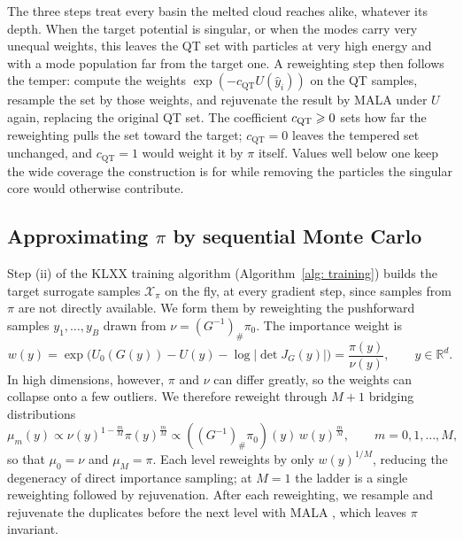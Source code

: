 \documentclass{article}
\begin{document}
The three steps treat every basin the melted cloud reaches alike, whatever its depth. When the target potential is singular, or when the modes carry very unequal weights, this leaves the QT set with particles at very high energy and with a mode population far from the target one. A reweighting step then follows the temper: compute the weights $\exp(-c_{\mathrm{QT}}U(\hat y_i))$ on the QT samples, resample the set by those weights, and rejuvenate the result by MALA under $U$ again, replacing the original QT set. The coefficient $c_{\mathrm{QT}}\geqslant0$ sets how far the reweighting pulls the set toward the target; $c_{\mathrm{QT}}=0$ leaves the tempered set unchanged, and $c_{\mathrm{QT}}=1$ would weight it by $\pi$ itself. Values well below one keep the wide coverage the construction is for while removing the particles the singular core would otherwise contribute.

\subsection{Approximating $\pi$ by sequential Monte Carlo}
\label{subsec: annealing}

Step (ii) of the KLXX training algorithm (Algorithm~\ref{alg: training}) builds the target surrogate samples $\mathcal X_{\pi}$ on the fly, at every gradient step, since samples from $\pi$ are not directly available. We form them by reweighting the pushforward samples $y_1,\dots,y_B$ drawn from $\nu=(G^{-1})_{\#}\pi_0$. The importance weight is
\begin{equation}
	w(y)
	= \exp\Big( U_0(G(y)) - U(y) - \log|\det J_G(y)| \Big)
	= \frac{\pi(y)}{\nu(y)},
	\qquad y \in \mathbb R^d.
	\label{eq: weight}
\end{equation}
In high dimensions, however, $\pi$ and $\nu$ can differ greatly, so the weights can collapse onto a few outliers. We therefore reweight through $M+1$ bridging distributions
\begin{equation}
	\mu_m(y) \propto \nu(y)^{1-\frac{m}{M}} \pi(y)^{\frac{m}{M}} \propto ((G^{-1})_{\#}\pi_0)(y)\, w(y)^{\frac{m}{M}}, \qquad m = 0,1,\dots,M,
	\label{eq: mu-m}
\end{equation}
so that $\mu_0 = \nu$ and $\mu_M = \pi$. Each level reweights by only $w(y)^{1/M}$, reducing the degeneracy of direct importance sampling; at $M=1$ the ladder is a single reweighting followed by rejuvenation.
After each reweighting, we resample and rejuvenate the duplicates before the next level with MALA \citep{roberts1996exponential}, which leaves $\pi$ invariant.
\end{document}

